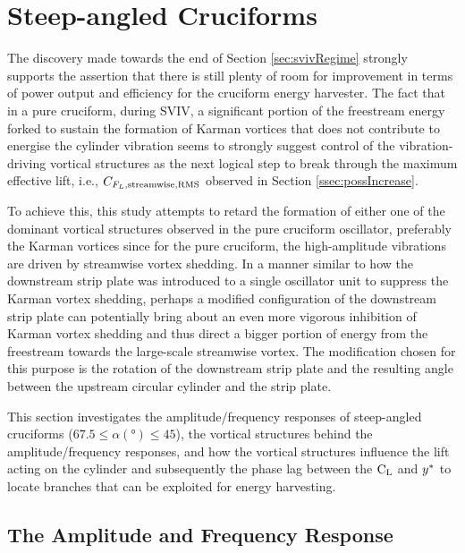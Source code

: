 \documentclass[oneside]{utmthesis}
\begin{document}
\section{Steep-angled Cruciforms}\label{sec:transitionToKarman}

\vspace{\baselineskip}

The discovery made towards the end of Section \ref{sec:svivRegime} strongly supports the assertion that there is still plenty of room for improvement in terms of power output and efficiency for the cruciform energy harvester. The fact that in a pure cruciform, during SVIV, a significant portion of the freestream energy forked to sustain the formation of Karman vortices that does not contribute to energise the cylinder vibration seems to strongly suggest control of the vibration-driving vortical structures as the next logical step to break through the maximum effective lift, i.e., $C_{F_{L},\text{streamwise},\text{RMS}}$ observed in Section \ref{ssec:possIncrease}.

To achieve this, this study attempts to retard the formation of either one of the dominant vortical structures observed in the pure cruciform oscillator, preferably the Karman vortices since for the pure cruciform, the high-amplitude vibrations are driven by streamwise vortex shedding. In a manner similar to how the downstream strip plate was introduced to a single oscillator unit to suppress the Karman vortex shedding, perhaps a modified configuration of the downstream strip plate can potentially bring about an even more vigorous inhibition of Karman vortex shedding and thus direct a bigger portion of energy from the freestream towards the large-scale streamwise vortex. The modification chosen for this purpose is the rotation of the downstream strip plate and the resulting angle between the upstream circular cylinder and the strip plate.

This section investigates the amplitude/frequency responses of steep-angled cruciforms ($67.5 \leq \alpha (\si{\degree}) \leq 45$), the vortical structures behind the amplitude/frequency responses, and how the vortical structures influence the lift acting on the cylinder and subsequently the phase lag between the $\text{C}_{\text{L}}$ and $y^{*}$ to locate branches that can be exploited for energy harvesting.

\subsection{The Amplitude and Frequency Response}\label{ssec:transRegimeAmpFreqResp}
\end{document}
